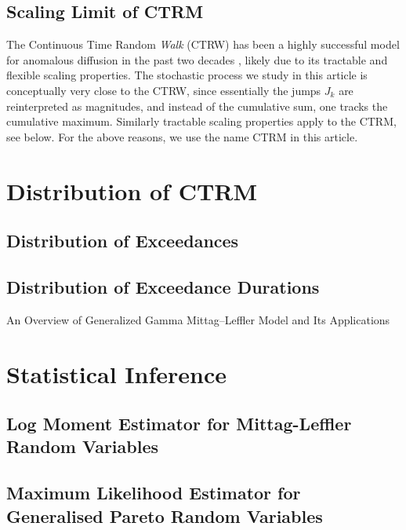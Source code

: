 \documentclass[honours,12pt]{UNSWthesis}
\newcommand{\1}{\mathbf 1}
\numberwithin{equation}{section}
\theoremstyle{definition}
\theoremstyle{remark}
\begin{document}
\section{Scaling Limit of CTRM}
The Continuous Time Random \emph{Walk} (CTRW) has been a highly successful 
model for anomalous diffusion in the past two decades 
\cite{Metzler2000,HLS2010b}, likely due to its tractable and flexible scaling
properties.
The stochastic process we study in this article is conceptually very close
to the CTRW, since essentially the jumps $J_k$ are reinterpreted as 
magnitudes, and instead of the cumulative sum, one tracks the cumulative 
maximum. Similarly tractable scaling properties apply to the CTRM, see below.
For the above reasons, we use the name CTRM in this article.

\chapter{Distribution of CTRM}\label{dist}
\section{Distribution of Exceedances}
\section{Distribution of Exceedance Durations}
An Overview of Generalized Gamma Mittag–Leffler Model and
Its Applications 

\chapter{Statistical Inference}
\section{Log Moment Estimator for Mittag-Leffler Random Variables}
\section{Maximum Likelihood Estimator for Generalised Pareto Random Variables}
\end{document}

